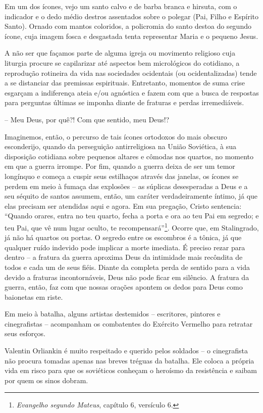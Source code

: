 Em um dos ícones, vejo um santo calvo e de barba branca e hirsuta, com o
indicador e o dedo médio destros assentados sobre o polegar (Pai, Filho
e Espírito Santo). Ornado com mantos coloridos, a policromia do santo
destoa do segundo ícone, cuja imagem fosca e desgastada tenta
representar Maria e o pequeno Jesus.

A não ser que façamos parte de alguma igreja ou movimento religioso cuja
liturgia procure se capilarizar até aspectos bem micrológicos do
cotidiano, a reprodução rotineira da vida nas sociedades ocidentais (ou
ocidentalizadas) tende a se distanciar das premissas espirituais.
Entretanto, momentos de suma crise esgarçam a indiferença ateia e/ou
agnóstica e fazem com que a busca de respostas para perguntas últimas se
imponha diante de fraturas e perdas irremediáveis.

-- Meu Deus, por quê?! Com que sentido, meu Deus!?

Imaginemos, então, o percurso de tais ícones ortodoxos do mais obscuro
esconderijo, quando da perseguição antirreligiosa na União Soviética, à
sua disposição cotidiana sobre pequenos altares e cômodas nos quartos,
no momento em que a guerra irrompe. Por fim, quando a guerra deixa de
ser um temor longínquo e começa a cuspir seus estilhaços através das
janelas, os ícones se perdem em meio à fumaça das explosões -- as
súplicas desesperadas a Deus e a seu séquito de santos assumem, então,
um caráter verdadeiramente íntimo, já que elas precisam ser atendidas
aqui e agora. Em sua pregação, Cristo sentencia: ``Quando orares, entra
no teu quarto, fecha a porta e ora ao teu Pai em segredo; e teu Pai, que
vê num lugar oculto, te recompensará''\footnote{\emph{Evangelho segundo
  Mateus}, capítulo 6, versículo 6.}. Ocorre que, em Stalingrado, já não
há quartos ou portas. O segredo entre os escombros é a tônica, já que
qualquer ruído indevido pode implicar a morte imediata. É preciso rezar
para dentro -- a fratura da guerra aproxima Deus da intimidade mais
recôndita de todos e cada um de seus fiéis. Diante da completa perda de
sentido para a vida devido a fraturas incontornáveis, Deus não pode
ficar em silêncio. A fratura da guerra, então, faz com que nossas
orações apontem os dedos para Deus como baionetas em riste.

Em meio à batalha, alguns artistas destemidos -- escritores, pintores e
cinegrafistas -- acompanham os combatentes do Exército Vermelho para
retratar seus esforços.

Valentin Orliankin é muito respeitado e querido pelos soldados -- o
cinegrafista não procura tomadas apenas nas breves tréguas da batalha.
Ele coloca a própria vida em risco para que os soviéticos conheçam o
heroísmo da resistência e saibam por quem os sinos dobram.

